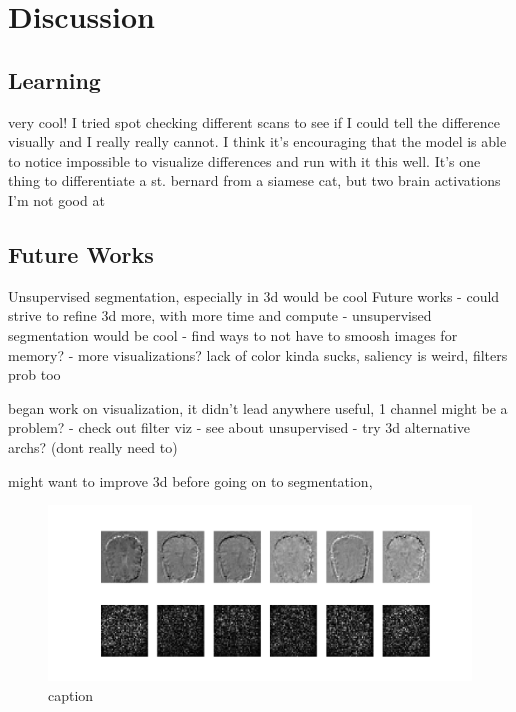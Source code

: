 \usepackage{graphicx}

\section{Discussion}\label{sec:discussion}

\subsection{Learning}\label{subsec:learning}
very cool! I tried spot checking different scans to see if I could tell the difference visually and I really really
cannot. I think it's encouraging that the model is able to notice impossible to visualize differences and run with it
this well. It's one thing to differentiate a st. bernard from a siamese cat, but two brain activations I'm not good at

\subsection{Future Works}\label{subsec:future-works}
Unsupervised segmentation, especially in 3d would be cool
Future works
- could strive to refine 3d more, with more time and compute
- unsupervised segmentation would be cool
- find ways to not have to smoosh images for memory?
- more visualizations? lack of color kinda sucks, saliency is weird, filters prob too

began work on visualization, it didn't lead anywhere useful, 1 channel might be a problem?
- check out filter viz
- see about unsupervised
- try 3d alternative archs? (dont really need to)

might want to improve 3d before going on to segmentation,

 \begin{figure}
  \includegraphics[width=\linewidth]{images/saliency.png}
  \caption{caption}
  \label{fig:saliency}
\end{figure}
